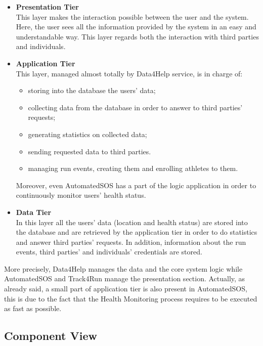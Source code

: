 \begin{itemize}
	\item \textbf{Presentation Tier} \\This layer makes the interaction possible between the user and the system. Here, the user sees all the information provided by the system in an easy and understandable way. This layer regards both the interaction with third parties and individuals. 
	\item \textbf{Application Tier} \\This layer, managed almost totally by Data4Help service, is in charge of:
	\begin{itemize}
		\item storing into the database the users' data;
		\item collecting data from the database in order to answer to third parties' requests;
		\item generating statistics on collected data;
		\item sending requested data to third parties.
		\item managing run events, creating them and enrolling athletes to them.
	\end{itemize}
	Moreover, even AutomatedSOS has a part of the logic application in order to continuously monitor users' health status.
	\item \textbf{Data Tier} \\In this layer all the users' data (location and health status) are stored into the database and are retrieved by the application tier in order to do statistics and answer third parties' requests. In addition, information about the run events, third parties' and individuals' credentials are stored.
\end{itemize}
\bigbreak
\noindent
More precisely, Data4Help manages the data and the core system logic while AutomatedSOS and Track4Run manage the presentation section. Actually, as already said, a small part of application tier is also present in AutomatedSOS, this is due to the fact that the Health Monitoring process requires to be executed as fast as possible. 
\subsection{Component View}

